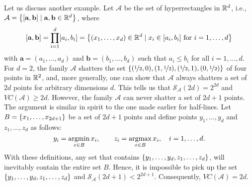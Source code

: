 Let us discuss another example. Let $\mathcal{A}$ be the set of hyperrectangles in $\mathbb{R}^d$, i.e., $\mathcal{A} = \left\{[\mathbf{a}, \mathbf{b}] \mathrel{|} \mathbf{a}, \mathbf{b} \in \mathbb{R}^d\right\}$, where
\[
    [\mathbf{a}, \mathbf{b}] = \prod_{i=1}^d [a_i, b_i] = \left\{(x_1, \dots, x_d) \in \mathbb{R}^d \mathrel{|} x_i \in [a_i, b_i] \text{ for } i = 1, \dots, d\right\}
\]
with $\mathbf{a} = (a_1, \dots, a_d)$ and $\mathbf{b} = (b_1, \dots, b_d)$ such that $a_i \leq b_i$ for all $i = 1, \dots, d$. For $d=2$, the family $\mathcal{A}$ shatters the set $\left\{(\nicefrac{1}{2}, 0), (1, \nicefrac{1}{2}), (\nicefrac{1}{2}, 1), (0, \nicefrac{1}{2})\right\}$ of four points in $\mathbb{R}^2$, and, more generally, one can show that $\mathcal{A}$ always shatters a set of $2d$ points for arbitrary dimensions $d$. This tells us that $\mathcal{S}_{\mathcal{A}}(2d) = 2^{2d}$ and $VC(\mathcal{A}) \geq 2d$. However, the family $\mathcal{A}$ can never shatter a set of $2d + 1$ points. The argument is similar in spirit to the one made earlier for half-lines. Let $B = \left\{x_1, \dots, x_{2d+1}\right\}$ be a set of $2d + 1$ points and define points $y_1, \dots, y_d$ and $z_1, \dots, z_d$ as follows:
\[
    y_i = \operatorname*{argmin}_{x \in B} x_i, \quad\quad z_i = \operatorname*{argmax}_{x \in B} x_i, \quad i = 1, \dots, d.
\]
With these definitions, any set that contains $\left\{y_1, \dots, y_d, z_1, \dots, z_d\right\}$, will inevitably contain the entire set $B$. Hence, it is impossible to pick up the set $\left\{y_1, \dots, y_d, z_1, \dots, z_d\right\}$ and $\mathcal{S}_{\mathcal{A}}(2d + 1) < 2^{2d + 1}$. Consequently, $VC(\mathcal{A}) = 2d$.

